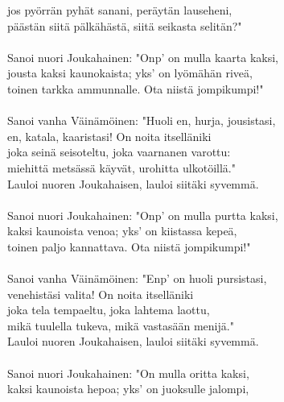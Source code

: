 jos pyörrän pyhät sanani, peräytän lauseheni,                 \\
päästän siitä pälkähästä, siitä seikasta selitän?"            \\
                                                              \\
Sanoi nuori Joukahainen: "Onp' on mulla kaarta kaksi,         \\
jousta kaksi kaunokaista; yks' on lyömähän riveä,             \\
toinen tarkka ammunnalle. Ota niistä jompikumpi!"             \\
                                                              \\
Sanoi vanha Väinämöinen: "Huoli en, hurja, jousistasi,        \\
en, katala, kaaristasi! On noita itselläniki                  \\
joka seinä seisoteltu, joka vaarnanen varottu:                \\
miehittä metsässä käyvät, urohitta ulkotöillä."               \\
Lauloi nuoren Joukahaisen, lauloi siitäki syvemmä.            \\
                                                              \\
Sanoi nuori Joukahainen: "Onp' on mulla purtta kaksi,         \\
kaksi kaunoista venoa; yks' on kiistassa kepeä,               \\
toinen paljo kannattava. Ota niistä jompikumpi!"              \\
                                                              \\
Sanoi vanha Väinämöinen: "Enp' on huoli pursistasi,           \\
venehistäsi valita! On noita itselläniki                      \\
joka tela tempaeltu, joka lahtema laottu,                     \\
mikä tuulella tukeva, mikä vastasään menijä."                 \\
Lauloi nuoren Joukahaisen, lauloi siitäki syvemmä.            \\
                                                              \\
Sanoi nuori Joukahainen: "On mulla oritta kaksi,              \\
kaksi kaunoista hepoa; yks' on juoksulle jalompi,             \\
